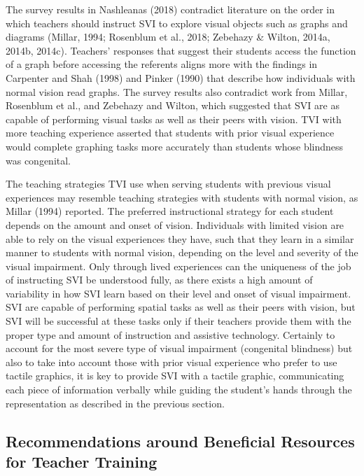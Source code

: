 \documentclass[11.5pt]{sig-alternate} %
\begin{document}
\begin{large}
The survey results in Nashleanas (2018) contradict literature on the order in which teachers should instruct SVI to explore visual objects such as graphs and diagrams (Millar, 1994; Rosenblum et al., 2018; Zebehazy \& Wilton, 2014a, 2014b, 2014c). Teachers’ responses that suggest their students access the function of a graph before accessing the referents aligns more with the findings in Carpenter and Shah (1998) and Pinker (1990) that describe how individuals with normal vision read graphs. The survey results also contradict work from Millar, Rosenblum et al., and Zebehazy and Wilton, which suggested that SVI are as capable of performing visual tasks as well as their peers with vision. TVI with more teaching experience asserted that students with prior visual experience would complete graphing tasks more accurately than students whose blindness was congenital.
 
The teaching strategies TVI use when serving students with previous visual experiences may resemble teaching strategies with students with normal vision, as Millar (1994) reported. The preferred instructional strategy for each student depends on the amount and onset of vision. Individuals with limited vision are able to rely on the visual experiences they have, such that they learn in a similar manner to students with normal vision, depending on the level and severity of the visual impairment. Only through lived experiences can the uniqueness of the job of instructing SVI be understood fully, as there exists a high amount of variability in how SVI learn based on their level and onset of visual impairment. SVI are capable of performing spatial tasks as well as their peers with vision, but SVI will be successful at these tasks only if their teachers provide them with the proper type and amount of instruction and assistive technology. Certainly to account for the most severe type of visual impairment (congenital blindness) but also to take into account those with prior visual experience who prefer to use tactile graphics, it is key to provide SVI with a tactile graphic, communicating each piece of information verbally while guiding the student's hands through the representation as described in the previous section.
 
\subsection*{Recommendations around Beneficial Resources for Teacher Training}


\end{large}
\end{document}
